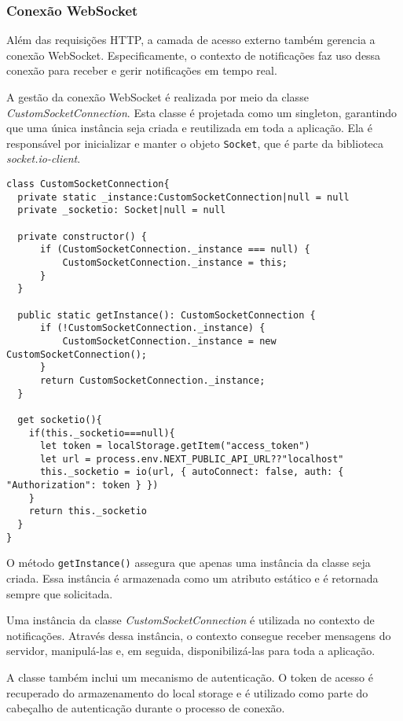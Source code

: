 \subsubsection{Conexão WebSocket}\label{subsec:websocketConncetion}
Além das requisições \gls{HTTP}, a camada de acesso externo também gerencia a conexão WebSocket. Especificamente, o contexto de notificações faz uso dessa conexão para receber e gerir notificações em tempo real.

A gestão da conexão WebSocket é realizada por meio da classe \textit{CustomSocketConnection}. Esta classe é projetada como um singleton, garantindo que uma única instância seja criada e reutilizada em toda a aplicação. Ela é responsável por inicializar e manter o objeto \texttt{Socket}, que é parte da biblioteca \textit{socket.io-client}.

\begin{verbatim}
class CustomSocketConnection{
  private static _instance:CustomSocketConnection|null = null
  private _socketio: Socket|null = null

  private constructor() {
      if (CustomSocketConnection._instance === null) {
          CustomSocketConnection._instance = this;
      }
  }

  public static getInstance(): CustomSocketConnection {
      if (!CustomSocketConnection._instance) {
          CustomSocketConnection._instance = new CustomSocketConnection();
      }
      return CustomSocketConnection._instance;
  }

  get socketio(){
    if(this._socketio===null){
      let token = localStorage.getItem("access_token")
      let url = process.env.NEXT_PUBLIC_API_URL??"localhost"
      this._socketio = io(url, { autoConnect: false, auth: { "Authorization": token } })
    }
    return this._socketio
  }
}
\end{verbatim}

O método \texttt{getInstance()} assegura que apenas uma instância da classe seja criada. Essa instância é armazenada como um atributo estático e é retornada sempre que solicitada. 

Uma instância da classe \textit{CustomSocketConnection} é utilizada no contexto de notificações. Através dessa instância, o contexto consegue receber mensagens do servidor, manipulá-las e, em seguida, disponibilizá-las para toda a aplicação. 

A classe também inclui um mecanismo de autenticação. O token de acesso é recuperado do armazenamento do local storage e é utilizado como parte do cabeçalho de autenticação durante o processo de conexão.

